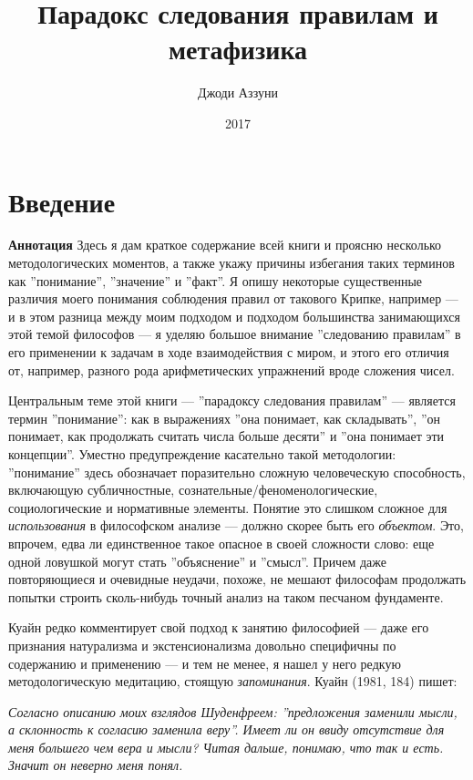 \documentclass[11pt]{book}
\title{Парадокс следования правилам и метафизика}
\author{Джоди Аззуни}
\date{2017}
\begin{document}

\null
    \thispagestyle{empty}%
    \addtocounter{page}{-1}%
    \newpage

\tableofcontents

\chapter{Введение}

\qquad

\textbf{Аннотация} \quad Здесь я дам краткое содержание всей книги и проясню несколько методологических моментов, а также укажу причины избегания таких терминов как ''понимание'', ''значение'' и ''факт''. Я опишу некоторые существенные различия моего понимания соблюдения правил от такового Крипке, например --- и в этом разница между моим подходом и подходом большинства занимающихся этой темой философов --- я уделяю большое внимание ''следованию правилам'' в его применении к задачам в ходе взаимодействия с миром, и этого его отличия от, например, разного рода арифметических упражнений вроде сложения чисел.

\qquad

Центральным теме этой книги --- ''парадоксу следования правилам'' --- является термин ''понимание'': как в выражениях ''она понимает, как складывать'', ''он понимает, как продолжать считать числа больше десяти'' и ''она понимает эти концепции''. Уместно предупреждение касательно такой методологии: ''понимание'' здесь обозначает поразительно сложную человеческую способность, включающую субличностные, сознательные/феноменологические, социологические и нормативные элементы. Понятие это слишком сложное для \textit{использования} в философском анализе --- должно скорее быть его \textit{объектом}. Это, впрочем, едва ли единственное такое опасное в своей сложности слово: еще одной ловушкой могут стать ''объяснение'' и ''смысл''. Причем даже повторяющиеся и очевидные неудачи, похоже, не мешают философам продолжать попытки строить сколь-нибудь точный анализ на таком песчаном фундаменте.

Куайн редко комментирует свой подход к занятию философией --- даже его признания натурализма и экстенсионализма довольно специфичны по содержанию и применению --- и тем не менее, я нашел у него редкую методологическую медитацию, стоящую \textit{запоминания}. Куайн (1981, 184) пишет:

\smallskip

\textit{Согласно описанию моих взглядов Шуденфреем: ''предложения заменили мысли, а склонность к согласию заменила веру''. Имеет ли он ввиду отсутствие для меня большего чем вера и мысли? Читая дальше, понимаю, что так и есть. Значит он неверно меня понял.}
\end{document}
